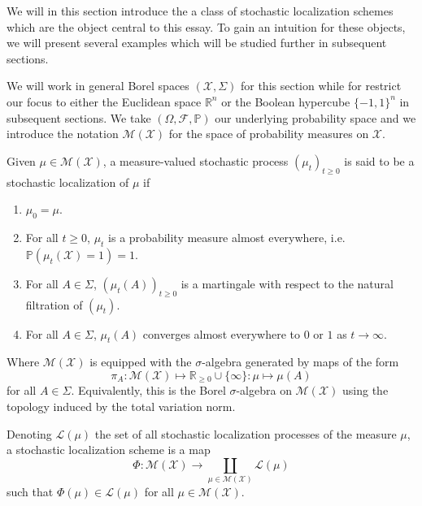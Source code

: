 We will in this section introduce the a class of stochastic localization schemes which are the object 
central to this essay. To gain an intuition for these objects, we will present several examples which 
will be studied further in subsequent sections. 

We will work in general Borel spaces \((\mathcal{X}, \Sigma)\) for this section while for restrict our 
focus to either the Euclidean space \(\mathbb{R}^n\) or the Boolean hypercube \(\{-1, 1\}^n\) 
in subsequent sections. We take \((\Omega, \mathscr{F}, \mathbb{P})\) our underlying probability space 
and we introduce the notation \(\mathcal{M}(\mathcal{X})\) for the space of probability measures on 
\(\mathcal{X}\).

\begin{definition}
  Given \(\mu \in \mathcal{M}(\mathcal{X})\), a measure-valued stochastic process 
  \((\mu_t)_{t \ge 0}\) is said to be a stochastic localization of \(\mu\) if 
  \begin{enumerate}[label=(L\arabic*), start=0]
    \item \label{L0} \(\mu_0 = \mu\).
    \item \label{L1} For all \(t \ge 0\), \(\mu_t\) is a probability measure almost everywhere, i.e. 
      \(\mathbb{P}(\mu_t(\mathcal{X}) = 1) = 1\).
    \item \label{L2} For all \(A \in \Sigma\), \((\mu_t(A))_{t \ge 0}\) is a martingale with respect 
      to the natural filtration of \((\mu_t)\).
    \item \label{L3} For all \(A \in \Sigma\), \(\mu_t(A)\) converges almost everywhere to \(0\) 
      or \(1\) as \(t \to \infty\).
  \end{enumerate}
  Where \(\mathcal{M}(\mathcal{X})\) is equipped with the \(\sigma\)-algebra generated by maps of the form 
  \[\pi_A : \mathcal{M}(\mathcal{X}) \mapsto \mathbb{R}_{\ge 0} \cup \{\infty\} : \mu \mapsto \mu(A)\] 
  for all \(A \in \Sigma\). Equivalently, this is the Borel \(\sigma\)-algebra on \(\mathcal{M}(\mathcal{X})\) 
  using the topology induced by the total variation norm.
\end{definition}


\begin{definition}
  Denoting \(\mathcal{L}(\mu)\) the set of all stochastic localization processes of the measure
  \(\mu\), a stochastic localization scheme is a map 
  \[\Phi : \mathcal{M}(\mathcal{X}) \to \coprod_{\mu \in \mathcal{M}(\mathcal{X})} \mathcal{L}(\mu)\] 
  such that \(\Phi(\mu) \in \mathcal{L}(\mu)\) for all \(\mu \in \mathcal{M}(\mathcal{X})\).
\end{definition}

